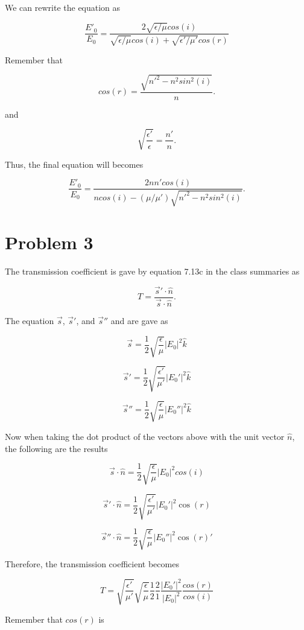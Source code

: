 \documentclass[11pt]{article}
\begin{document}
We can rewrite the equation as

$$
\frac{E'_{0}}{E_{0}} = \frac{2\sqrt{\epsilon/\mu} cos(i)}{\sqrt{\epsilon/\mu} cos(i) + \sqrt{\epsilon'/\mu'}cos(r)}
$$

Remember that 

$$
cos(r) = \frac{\sqrt{n'^{2} - n^{2}sin^{2}(i)}}{n}.
$$

and 

$$
\sqrt{\frac{\epsilon'}{\epsilon}} = \frac{n'}{n}.
$$

Thus, the final equation will becomes

$$
\frac{E'_{0}}{E_{0}} = \frac{2nn'cos(i)}{ncos(i) - (\mu/\mu')\sqrt{n'^{2} - n^{2}sin^{2}(i)}}.
$$

\clearpage

\section*{Problem 3}

The transmission coefficient is gave by equation 7.13c in the class summaries as

$$
T = \frac{\vec{s}' \cdot \hat{n}}{\vec{s} \cdot \hat{n}}.
$$

The equation $\vec{s}$, $\vec{s}'$, and $\vec{s}''$ and are gave as 

$$
\vec{s} = \frac{1}{2}\sqrt{\frac{\epsilon}{\mu}}|E_{0}|^{2}\hat{k}
$$

$$
\vec{s}' = \frac{1}{2}\sqrt{\frac{\epsilon'}{\mu'}}|E_{0}'|^{2}\hat{k}
$$

$$
\vec{s}'' = \frac{1}{2}\sqrt{\frac{\epsilon}{\mu}}|E_{0}''|^{2}\hat{k}
$$

Now when taking the dot product of the vectors above with the unit vector $\hat{n}$, the following are the results

$$
\vec{s} \cdot \hat{n} = \frac{1}{2}\sqrt{\frac{\epsilon}{\mu}}|E_{0}|^{2}cos(i)
$$

$$
\vec{s}' \cdot \hat{n} = \frac{1}{2}\sqrt{\frac{\epsilon'}{\mu'}}|E_{0}'|^{2}\cos(r)
$$

$$
\vec{s}'' \cdot \hat{n} = \frac{1}{2}\sqrt{\frac{\epsilon}{\mu}}|E_{0}''|^{2}\cos(r)'
$$

Therefore, the transmission coefficient becomes

$$
T = \sqrt{\frac{\epsilon'}{\mu'}} \sqrt{\frac{\epsilon}{\mu}} \frac{1}{2} \frac{2}{1} \frac{|E_{0}'|^{2}}{|E_{0}|^{2}} \frac{cos(r)}{cos(i)}
$$

Remember that $cos(r)$ is
\end{document}
